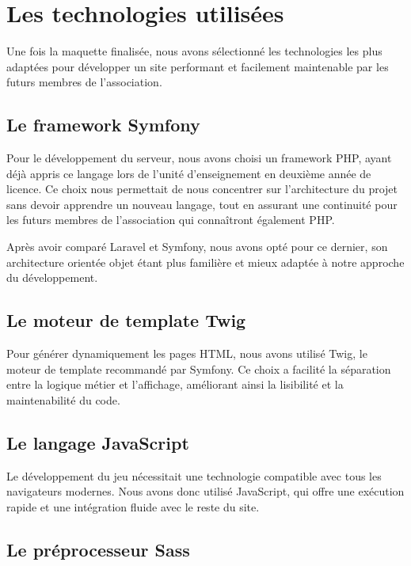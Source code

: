 
\section{Les technologies utilisées}

Une fois la maquette finalisée, nous avons sélectionné les technologies les plus adaptées pour développer un site performant et facilement maintenable par les futurs membres de l’association.

\subsection{Le framework Symfony}

Pour le développement du serveur, nous avons choisi un framework PHP, ayant déjà appris ce langage lors de l’unité d’enseignement  en deuxième année de licence. Ce choix nous permettait de nous concentrer sur l’architecture du projet sans devoir apprendre un nouveau langage, tout en assurant une continuité pour les futurs membres de l’association qui connaîtront également PHP.

Après avoir comparé Laravel et Symfony, nous avons opté pour ce dernier, son architecture orientée objet étant plus familière et mieux adaptée à notre approche du développement.

\subsection{Le moteur de template Twig}

Pour générer dynamiquement les pages HTML, nous avons utilisé Twig, le moteur de template recommandé par Symfony. Ce choix a facilité la séparation entre la logique métier et l'affichage, améliorant ainsi la lisibilité et la maintenabilité du code.

\subsection{Le langage JavaScript}

Le développement du jeu nécessitait une technologie compatible avec tous les navigateurs modernes. Nous avons donc utilisé JavaScript, qui offre une exécution rapide et une intégration fluide avec le reste du site.

\subsection{Le préprocesseur Sass}

